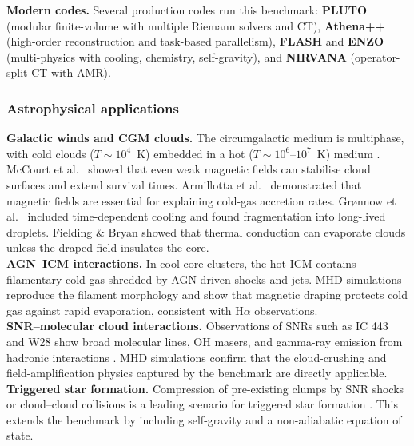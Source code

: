 \documentclass[11pt,a4paper]{article}
\begin{document}
\textbf{Modern codes.} Several production codes run this benchmark: \textbf{PLUTO} \cite{mignone2007, mignone2012, mignone2023} (modular finite-volume with multiple Riemann solvers and CT), \textbf{Athena++} \cite{stone2020} (high-order reconstruction and task-based parallelism), \textbf{FLASH} \cite{fryxell2000} and \textbf{ENZO} \cite{bryan2014} (multi-physics with cooling, chemistry, self-gravity), and \textbf{NIRVANA} \cite{ziegler2008} (operator-split CT with AMR).

\subsubsection{Astrophysical applications}

\textbf{Galactic winds and CGM clouds.} The circumgalactic medium is multiphase, with cold clouds ($T \sim 10^4$~K) embedded in a hot ($T \sim 10^6$--$10^7$~K) medium \cite{tumlinson2017}. McCourt et al.\ \cite{mccourt2015} showed that even weak magnetic fields can stabilise cloud surfaces and extend survival times. Armillotta et al.\ \cite{armillotta2016} demonstrated that magnetic fields are essential for explaining cold-gas accretion rates. Gr{\o}nnow et al.\ \cite{gronnow2017, gronnow2018} included time-dependent cooling and found fragmentation into long-lived droplets. Fielding \& Bryan \cite{fielding2022} showed that thermal conduction can evaporate clouds unless the draped field insulates the core.
\\

\textbf{AGN--ICM interactions.} In cool-core clusters, the hot ICM contains filamentary cold gas shredded by AGN-driven shocks and jets. MHD simulations \cite{gaspari2012, fabian2006} reproduce the filament morphology and show that magnetic draping protects cold gas against rapid evaporation, consistent with H$\alpha$ observations.
\\

\textbf{SNR--molecular cloud interactions.} Observations of SNRs such as IC 443 and W28 show broad molecular lines, OH masers, and gamma-ray emission from hadronic interactions \cite{slane2015, ustamujic2021}. MHD simulations confirm that the cloud-crushing and field-amplification physics captured by the benchmark are directly applicable.
\\

\textbf{Triggered star formation.} Compression of pre-existing clumps by SNR shocks or cloud--cloud collisions is a leading scenario for triggered star formation \cite{inoue2013}. This extends the benchmark by including self-gravity and a non-adiabatic equation of state.
\\
\end{document}
